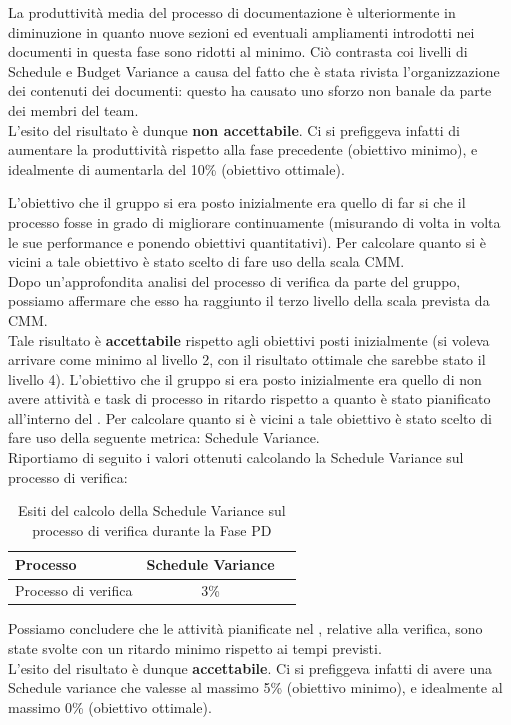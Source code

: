 				La produttività media del processo di documentazione è ulteriormente in diminuzione in quanto nuove sezioni ed eventuali ampliamenti introdotti nei documenti in questa fase sono ridotti al minimo. Ciò contrasta coi livelli di Schedule e Budget Variance a causa del fatto che è stata rivista l'organizzazione dei contenuti dei documenti: questo ha causato uno sforzo non banale da parte dei membri del team.\\
				L'esito del risultato è dunque \textbf{non accettabile}. Ci si prefiggeva infatti di aumentare la produttività rispetto alla fase precedente (obiettivo minimo), e idealmente di aumentarla del 10\% (obiettivo ottimale).

				L'obiettivo che il gruppo si era posto inizialmente era quello di far si che il processo fosse in grado di migliorare continuamente (misurando di volta in volta le sue performance e ponendo obiettivi quantitativi). Per calcolare quanto si è vicini a tale obiettivo è stato scelto di fare uso della scala CMM.\\
				Dopo un'approfondita analisi del processo di verifica da parte del gruppo, possiamo affermare che esso ha raggiunto il terzo livello della scala prevista da CMM.\\
				Tale risultato è \textbf{accettabile} rispetto agli obiettivi posti inizialmente (si voleva arrivare come minimo al livello 2, con il risultato ottimale che sarebbe stato il livello 4).
				L'obiettivo che il gruppo si era posto inizialmente era quello di non avere attività e task di processo in ritardo rispetto a quanto è stato pianificato all'interno del . Per calcolare quanto si è vicini a tale obiettivo è stato scelto di fare uso della seguente metrica: Schedule Variance.\\
				Riportiamo di seguito i valori ottenuti calcolando la Schedule Variance sul processo di verifica:
				\begin{table}[H]
					\centering
					\begin{tabu}{| l | c | c |}
						\hline
						Processo 			   & Schedule Variance   \\ \hline \hline
						Processo di verifica   & 3\%                 \\ \hline
					\end{tabu}
					\caption{Esiti del calcolo della Schedule Variance sul processo di verifica durante la Fase PD}
				\end{table}
				Possiamo concludere che le attività pianificate nel , relative alla verifica, sono state svolte con un ritardo minimo rispetto ai tempi previsti.\\
				L'esito del risultato è dunque \textbf{accettabile}. Ci si prefiggeva infatti di avere una Schedule variance che valesse al massimo 5\% (obiettivo minimo), e idealmente al massimo 0\% (obiettivo ottimale).	

